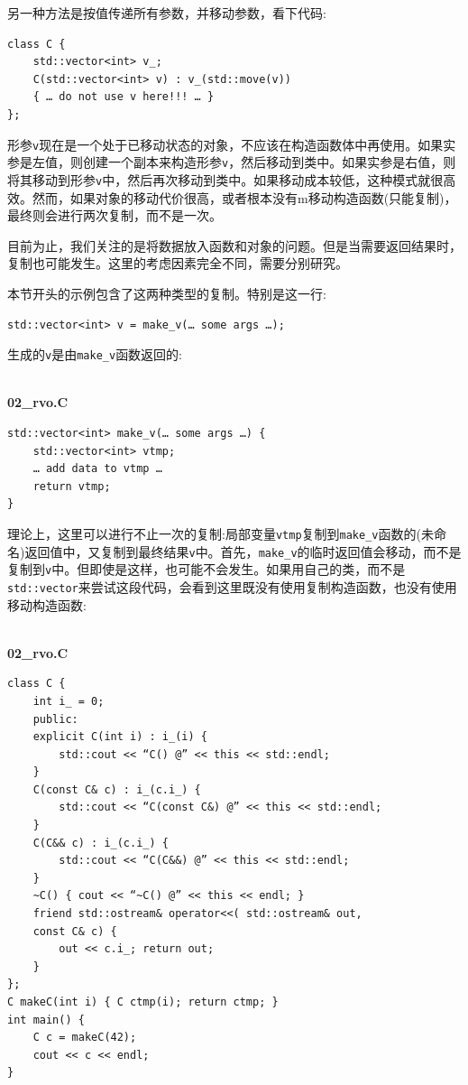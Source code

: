 另一种方法是按值传递所有参数，并移动参数，看下代码:

\begin{lstlisting}[style=styleCXX]
class C {
	std::vector<int> v_;
	C(std::vector<int> v) : v_(std::move(v)) 
	{ … do not use v here!!! … }
};
\end{lstlisting}

形参\texttt{v}现在是一个处于已移动状态的对象，不应该在构造函数体中再使用。如果实参是左值，则创建一个副本来构造形参\texttt{v}，然后移动到类中。如果实参是右值，则将其移动到形参\texttt{v}中，然后再次移动到类中。如果移动成本较低，这种模式就很高效。然而，如果对象的移动代价很高，或者根本没有m移动构造函数(只能复制)，最终则会进行两次复制，而不是一次。 

目前为止，我们关注的是将数据放入函数和对象的问题。但是当需要返回结果时，复制也可能发生。这里的考虑因素完全不同，需要分别研究。


本节开头的示例包含了这两种类型的复制。特别是这一行:

\begin{lstlisting}[style=styleCXX]
std::vector<int> v = make_v(… some args …);
\end{lstlisting}

生成的\texttt{v}是由\texttt{make\_v}函数返回的:

\hspace*{\fill} \\ %
\noindent
\textbf{02\_rvo.C}
\begin{lstlisting}[style=styleCXX]
std::vector<int> make_v(… some args …) {
	std::vector<int> vtmp;
	… add data to vtmp …
	return vtmp;
}
\end{lstlisting}

理论上，这里可以进行不止一次的复制:局部变量\texttt{vtmp}复制到\texttt{make\_v}函数的(未命名)返回值中，又复制到最终结果\texttt{v}中。首先，\texttt{make\_v}的临时返回值会移动，而不是复制到\texttt{v}中。但即使是这样，也可能不会发生。如果用自己的类，而不是\texttt{std::vector}来尝试这段代码，会看到这里既没有使用复制构造函数，也没有使用移动构造函数:

\hspace*{\fill} \\ %
\noindent
\textbf{02\_rvo.C}
\begin{lstlisting}[style=styleCXX]
class C {
	int i_ = 0;
	public:
	explicit C(int i) : i_(i) { 
		std::cout << “C() @” << this << std::endl;
	}
	C(const C& c) : i_(c.i_) {
		std::cout << “C(const C&) @” << this << std::endl;
	}
	C(C&& c) : i_(c.i_) {
		std::cout << “C(C&&) @” << this << std::endl;
	}
	~C() { cout << “~C() @” << this << endl; }
	friend std::ostream& operator<<( std::ostream& out,
	const C& c) {
		out << c.i_; return out;
	}
};  
C makeC(int i) { C ctmp(i); return ctmp; }
int main() {
	C c = makeC(42);
	cout << c << endl;
}
\end{lstlisting}

